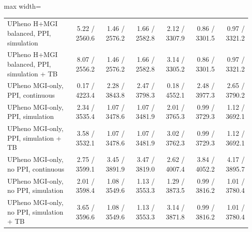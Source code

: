 \begin{landscape}
\begin{table}[p]
\begin{adjustbox}{max width=\linewidth}
\begin{tabular}{lrrrrrr}
UPheno H+MGI balanced, PPI, simulation & 5.22 / 2560.6 & 1.46 / 2576.2 & 1.66 / 2582.8 & 2.12 / 3307.9 & 0.86 / 3301.5 & 0.97 / 3321.2 \\
UPheno H+MGI balanced, PPI, simulation + TB & 8.07 / 2556.2 & 1.46 / 2576.2 & 1.66 / 2582.8 & 3.14 / 3305.2 & 0.86 / 3301.5 & 0.97 / 3321.2 \\
UPheno MGI-only, PPI, continuous & 0.17 / 4223.4 & 2.28 / 3843.8 & 2.47 / 3798.3 & 0.18 / 4552.1 & 2.48 / 3977.3 & 2.65 / 3790.2 \\
UPheno MGI-only, PPI, simulation & 2.34 / 3535.4 & 1.07 / 3478.6 & 1.07 / 3481.9 & 2.01 / 3765.3 & 0.99 / 3729.3 & 1.12 / 3692.1 \\
UPheno MGI-only, PPI, simulation + TB & 3.58 / 3532.1 & 1.07 / 3478.6 & 1.07 / 3481.9 & 3.02 / 3762.3 & 0.99 / 3729.3 & 1.12 / 3692.1 \\
UPheno MGI-only, no PPI, continuous & 2.75 / 3599.1 & 3.45 / 3891.9 & 3.47 / 3819.0 & 2.62 / 4007.4 & 3.84 / 4052.2 & 4.17 / 3895.7 \\
UPheno MGI-only, no PPI, simulation & 2.01 / 3598.4 & 1.08 / 3549.6 & 1.13 / 3553.3 & 1.29 / 3873.5 & 0.99 / 3816.2 & 1.01 / 3780.4 \\
UPheno MGI-only, no PPI, simulation + TB & 3.65 / 3596.6 & 1.08 / 3549.6 & 1.13 / 3553.3 & 3.14 / 3871.8 & 0.99 / 3816.2 & 1.01 / 3780.4 \\
\bottomrule
\end{tabular}
\end{adjustbox}
\end{table}
\clearpage
\end{landscape}

